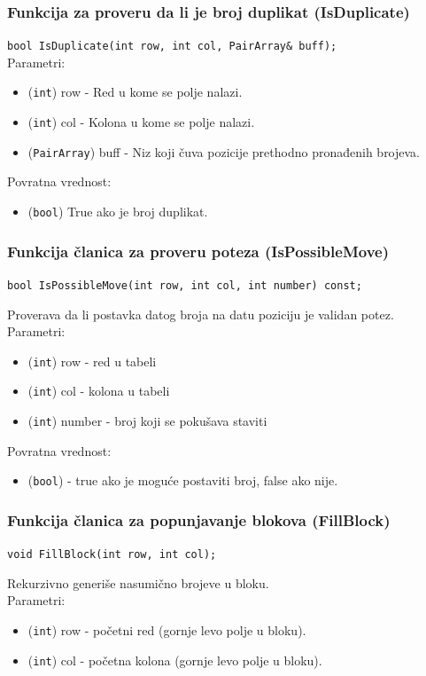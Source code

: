 \documentclass[a4paper]{article}
\begin{document}
    \subsubsection{Funkcija za proveru da li je broj duplikat (IsDuplicate)}
    \texttt{bool IsDuplicate(int row, int col, PairArray\& buff);}\\
    Parametri:
    \begin{itemize}
        \item (\texttt{int}) row - Red u kome se polje nalazi.
        \item (\texttt{int}) col - Kolona u kome se polje nalazi.
        \item (\texttt{PairArray}) buff - Niz koji čuva pozicije prethodno pronađenih brojeva.
    \end{itemize}
    Povratna vrednost:
    \begin{itemize}
        \item (\texttt{bool}) True ako je broj duplikat.
    \end{itemize}

    \subsubsection{Funkcija članica za proveru poteza (IsPossibleMove)}
    \texttt{bool IsPossibleMove(int row, int col, int number) const;}
    \par Proverava da li postavka datog broja na datu poziciju je validan potez.
    Parametri:
    \begin{itemize}
        \item (\texttt{int}) row - red u tabeli
        \item (\texttt{int}) col - kolona u tabeli
        \item (\texttt{int}) number - broj koji se pokušava staviti
    \end{itemize}
    Povratna vrednost:
    \begin{itemize}
        \item (\texttt{bool}) - true ako je moguće postaviti broj, false ako nije.
    \end{itemize}

    \subsubsection{Funkcija članica za popunjavanje blokova (FillBlock)}
    \texttt{void FillBlock(int row, int col);}
    \par Rekurzivno generiše nasumično brojeve u bloku.\\
    Parametri:
    \begin{itemize}
        \item (\texttt{int}) row - početni red (gornje levo polje u bloku).
        \item (\texttt{int}) col - početna kolona (gornje levo polje u bloku).
    \end{itemize}
\end{document}
